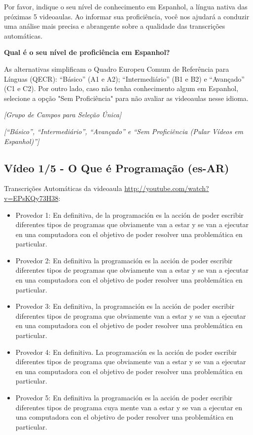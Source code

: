 \noindent
Por favor, indique o seu nível de conhecimento em Espanhol, a língua nativa das próximas 
5 videoaulas. Ao informar sua proficiência, você nos ajudará a conduzir uma análise mais 
precisa e abrangente sobre a qualidade das transcrições automáticas.

\noindent
\textbf{Qual é o seu nível de proficiência em Espanhol?}

\noindent
As alternativas simplificam o Quadro Europeu Comum de Referência para Línguas (QECR): ``Básico'' (A1 e A2); ``Intermediário'' (B1 e B2) e ``Avançado'' (C1 e C2). Por outro lado, caso não tenha conhecimento algum em Espanhol, selecione a opção "Sem Proficiência" para não avaliar as videoaulas nesse idioma.

\noindent
\textit{[Grupo de Campos para Seleção Única]}

\noindent
\textit{[``Básico'', ``Intermediário'', ``Avançado'' e ``Sem Proficiência (Pular Vídeos em Espanhol)'']}

\subsection{Vídeo 1/5 - O Que é Programação (es-AR)}

\noindent
Transcrições Automáticas da videoaula \url{http://youtube.com/watch?v=EPsKQy73H38}:

\begin{itemize}
    \item Provedor 1: En definitiva, de la programación es la acción de poder escribir diferentes tipos de programas que obviamente van a estar y se van a ejecutar en una computadora con el objetivo de poder resolver una problemática en particular.
    \item Provedor 2: En definitiva la programación es la acción de poder escribir diferentes tipos de programas que obviamente van a estar y se van a ejecutar en una computadora con el objetivo de poder resolver una problemática en particular.
    \item Provedor 3: En definitiva, la programación es la acción de poder escribir diferentes tipos de programa que obviamente van a estar y se van a ejecutar en una computadora con el objetivo de poder resolver una problemática en particular.
    \item Provedor 4: En definitiva. La programación es la acción de poder escribir diferentes tipos de programa que obviamente van a estar y se van a ejecutar en una computadora con el objetivo de poder resolver una problemática en particular.
    \item Provedor 5: En definitiva la programación es la acción de poder escribir diferentes tipos de programa cuya mente van a estar y se van a ejecutar en una computadora con el objetivo de poder resolver una problemática en particular.
\end{itemize}

